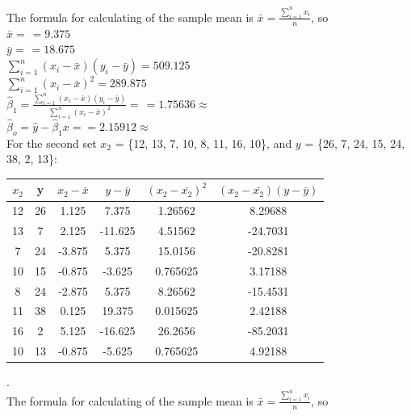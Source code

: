 \documentclass[a4paper,12pt,titlepage]{article} %
\begin{document}
The formula for calculating of the sample mean is $ \bar{x} = \frac{\sum_{i=1}^{n} x_{i}}{n} $, so \\

$\bar{x} = \frac{}{} = 9.375 $ \\

$\bar{y} = \frac{}{} = 18.675 $ \\

$ \sum_{i=1}^{n} (x_{i}-\bar{x}) (y_{i}-\bar{y}) = 509.125 $ \\

$ \sum_{i=1}^{n} (x_{i}-\bar{x})^{2} = 289.875 $ \\

$ \hat{\beta}_{1} = \frac{\sum_{i=1}^{n} (x_{i}-\bar{x}) (y_{i}-\bar{y})}{ \sum_{i=1}^{n} (x_{i}-\bar{x})^{2} } = \frac{}{} = 1.75636 \approx  $ \\

$ \hat{\beta}_{o} = \hat{y} - \hat{\beta}_{1} x =  = 2.15912 \approx  $ \\

For the second set $ x_{2} $ = \{12, 13, 7, 10, 8, 11, 16, 10\}, and $ y $ = \{26, 7, 24, 15, 24, 38, 2, 13\}:\\
  \begin{tabular}{|c|c|c|c|c|c|}
    \hline
    $ x_2  $ & y & $ x_2 - \bar{x} $ & $ y - \bar{y} $ & $ (x_2 - \bar{x_2})^{2} $ & $ (x_2 - \bar{x_2})(y - \bar{y}) $ \\
    \hline
    12	& 26	& 1.125 	& 7.375 	& 1.26562	& 8.29688	\\
    \hline
    13	& 7	& 2.125 	& -11.625	& 4.51562	& -24.7031	\\
    \hline
    7	& 24	& -3.875	& 5.375 	& 15.0156	& -20.8281	\\
    \hline
    10	& 15	& -0.875	& -3.625	& 0.765625	& 3.17188	\\
    \hline
    8	& 24	& -2.875	& 5.375 	& 8.26562	& -15.4531	\\
    \hline
    11	& 38	& 0.125 	& 19.375	& 0.015625	& 2.42188	\\
    \hline
    16	& 2	& 5.125 	& -16.625	& 26.2656	& -85.2031	\\
    \hline
    10	& 13	& -0.875	& -5.625	& 0.765625	& 4.92188	\\
    \hline
  \end{tabular}

.\\

The formula for calculating of the sample mean is $ \bar{x} = \frac{\sum_{i=1}^{n} x_{i}}{n} $, so \\
\end{document}
